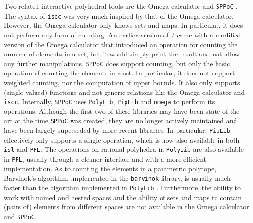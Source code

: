 Two related interactive polyhedral tools are
the Omega calculator 
and {\tt SPPoC} .
The syntax of {\tt iscc} was very much inspired
by that of the Omega calculator.  However, the Omega
calculator only knows sets and maps.  In particular,
it does not perform any form of counting.  An earlier version
of \barvinok/ came with a modified version of
the Omega calculator that introduced an operation
for counting the number of elements in a set, but it
would simply print the result and not allow any further
manipulations.
{\tt SPPoC} does support counting, but only the basic
operation of counting the elements in a set.
In particular, it does not support weighted counting,
nor the computation of upper bounds.
It also only supports (single-valued) functions
and not generic relations like the Omega calculator and {\tt iscc}.
Internally, {\tt SPPoC} uses {\tt PolyLib}, {\tt PipLib} and {\tt omega}
to perform
its operations.  Although the first two of these libraries may have been
state-of-the-art at the time {\tt SPPoC} was created, they are
no longer actively maintained and have been largely
superseded by more recent libraries.
In particular, {\tt PipLib} effectively only supports a single
operation, which is now also available in both {\tt isl} and {\tt PPL}.
The operations on rational polyhedra in {\tt PolyLib} are also
available in {\tt PPL}, usually through a cleaner interface and
with a more efficient implementation.  As to counting the elements
in a parametric polytope, Barvinok's algorithm,
implemented in the {\tt barvinok} library, is usually much faster
than the algorithm implemented in {\tt PolyLib}
.
Furthermore,
the ability to work with named and nested spaces and the ability
of sets and maps to contain (pairs of) elements from different spaces
are not available in the Omega calculator and {\tt SPPoC}.

